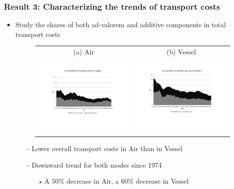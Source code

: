 \documentclass[10 pt,Helvetica, french]{beamer}
\begin{document}
\begin{frame}[label=slide_fig1]
\frametitle{Result 3: Characterizing the trends of transport costs }
\begin{itemize}
\item Study the shares of both ad-valorem and additive components in total transport costs  \hyperlink{slide_result2}{} \hyperlink{slide_comment_compositioneffects}{}
\begin{figure}[htbp]
\begin{center}
\begin{tabular}{cc}
{\scriptsize (a) Air } & {\scriptsize  (b) Vessel}\\
\includegraphics[width=5cm, height=4cm]{Fig2a_decompTC_air_3d.pdf}
& \includegraphics[width=5cm,height=4cm]{Fig2b_decompTC_vessel_3d.pdf} \\
\end{tabular}\end{center}
\end{figure}
\begin{itemize}
\item[-] Lower overall transport costs in Air than in Vessel \vspace{0.1cm}
\item[-] Downward trend for both modes since 1974 \hyperlink{app_fig1}{}\vspace{0.1cm}
\begin{itemize}
\item[$\star$] A 50\% decrease in Air, a 60\% decrease in Vessel \vspace{0.1cm}
\end{itemize}
\end{itemize}
\end{itemize}
\end{frame}
\end{document}
